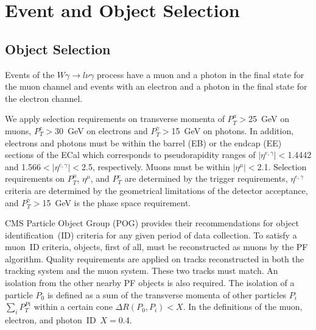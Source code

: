\section{Event and Object Selection}
\label{sec:AN_Selection}

\subsection{Object Selection}
\label{sec:AN_ObjectSelection}

Events of the $W\gamma\rightarrow l\nu\gamma$ process have a muon and a photon in the final state for the muon channel and events with an electron and a photon in the final state for the electron channel. 

We apply selection requirements on transverse momenta of $P_T^{\mu}>$25~GeV on muons,  $P_T^e>$30~GeV on electrons and $P_T^{\gamma}>$15~GeV on photons. In addition, electrons and photons must be within the barrel (EB) or the endcap (EE) sections of the ECal which corresponds to pseudorapidity ranges of $|\eta^{e,\gamma}| < $1.4442 and 1.566$ < |\eta^{e,\gamma}| < $2.5, respectively. Muons must be within $|\eta^{\mu}|<$2.1. Selection requirements on $P_T^{\mu}$, $\eta^{\mu}$, and $P_T^e$ are determined by the trigger requirements, $\eta^{e,\gamma}$ criteria are determined by the geometrical limitations of the detector acceptance, and $P_T^{\gamma}>$15~GeV is the phase space requirement.

CMS Particle Object Group (POG) provides their recommendations for object identification~(ID) criteria for any given period of data collection. To satisfy a muon~ID criteria, objects, first of all, must be reconstructed as muons by the PF algorithm. Quality requirements are applied on tracks reconstructed in both the tracking system and the muon system. These two tracks must match. An isolation from the other nearby PF objects is also required. The isolation of a particle $P_0$ is defined as a sum of the transverse momenta of other particles $P_i$ $\sum_i P_T^{Pi}$ within a certain cone $\Delta R(P_0,P_i)<X$. In the definitions of the muon, electron, and photon~ID~$X=$0.4. 


